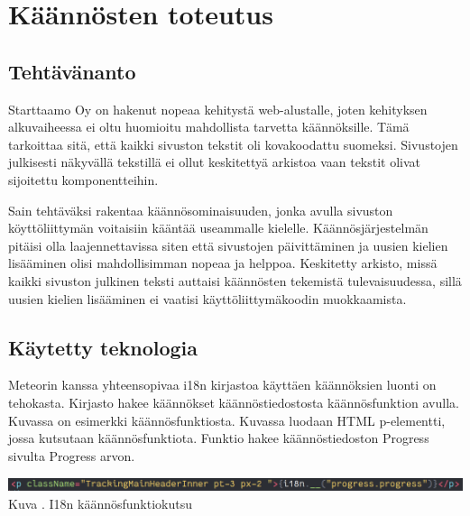 \documentclass[11pt,a4paper,titlepage,oneside]{article}
\begin{document}
\newpage




\section{Käännösten toteutus}


\subsection{Tehtävänanto}


Starttaamo Oy on hakenut nopeaa kehitystä web-alustalle, joten kehityksen alkuvaiheessa 
ei oltu huomioitu mahdollista tarvetta käännöksille. 
Tämä tarkoittaa sitä, että kaikki sivuston tekstit oli kovakoodattu suomeksi.
Sivustojen julkisesti näkyvällä tekstillä ei ollut keskitettyä arkistoa vaan tekstit olivat sijoitettu komponentteihin.
\medskip

Sain tehtäväksi rakentaa käännösominaisuuden, jonka avulla sivuston köyttöliittymän voitaisiin kääntää useammalle kielelle.
Käännösjärjestelmän pitäisi olla laajennettavissa siten että sivustojen päivittäminen ja uusien kielien lisääminen 
olisi mahdollisimman nopeaa ja helppoa.
Keskitetty arkisto, missä kaikki sivuston julkinen teksti auttaisi käännösten tekemistä tulevaisuudessa,
sillä uusien kielien lisääminen ei vaatisi käyttöliittymäkoodin muokkaamista.







\subsection{Käytetty teknologia}


Meteorin kanssa yhteensopivaa i18n kirjastoa käyttäen käännöksien luonti on tehokasta.
Kirjasto hakee käännökset käännöstiedostosta käännösfunktion avulla.
Kuvassa \nextImageCount{} on esimerkki käännösfunktiosta.
Kuvassa luodaan HTML p-elementti, jossa kutsutaan käännösfunktiota. 
Funktio hakee käännöstiedoston Progress sivulta Progress arvon.\\
\medskip

\bigskip
\includegraphics[width = 15cm]{src/public/oppar/translationcall.png}\\
Kuva \getImgCount. {} I18n käännösfunktiokutsu 
\medskip
\end{document}
